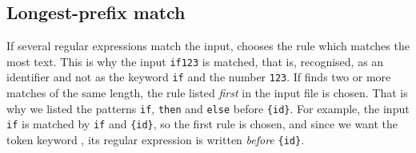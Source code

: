 \subsection*{Longest-prefix match}
 
If several regular expressions match the input, \Lex chooses the rule
which matches the most text. This is why the input \verb+if123+ is
matched, that is, recognised, as an identifier and not as the keyword
\verb+if+ and the number \verb+123+. If \Lex finds two or more matches
of the same length, the rule listed \emph{first} in the \Lex input
file is chosen. That is why we listed the patterns \verb+if+,
\verb+then+ and \verb+else+ before \verb+{id}+. For example, the input
\verb+if+ is matched by \verb+if+ and \verb+{id}+, so the first rule
is chosen, and since we want the token keyword , its regular
expression is written \emph{before} \verb+{id}+.

